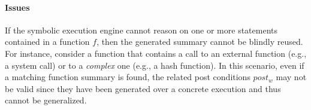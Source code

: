 \paragraph{Issues} If the symbolic execution engine cannot reason on one or more statements contained in a function $f$, then the generated summary cannot be blindly reused. For instance, consider a function that contains a call to an external function (e.g., a system call) or to a {\em complex} one (e.g., a hash function). In this scenario, even if a matching function summary is found, the related post conditions $post_w$ may not be valid since they have been generated over a concrete execution and thus cannot be generalized. %
